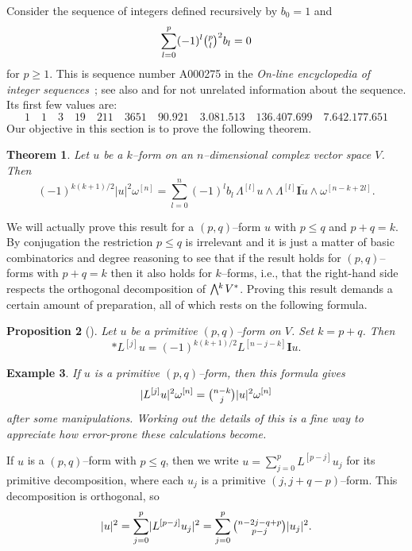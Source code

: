 \documentclass[11pt,a4paper]{amsart}
\def\^#1{^{[#1]}}
\def\bw#1{\bigwedge{}^{\mkern-5mu #1}\mkern2mu}
\def\I{\mathbf{I}}
\theoremstyle{slthm}
\newtheorem{theo}{Theorem}[section]
\newtheorem{prop}[theo]{Proposition}
\theoremstyle{sldef}
\newtheorem{exam}[theo]{Example}
\theoremstyle{slrem}
\numberwithin{equation}{section}
\begin{document}
Consider the sequence of integers defined recursively by $b_0 = 1$ and
\begin{equation}
\label{bezel}
\sum_{l=0}^{p} (-1)^{l} \tbinom{p}{l}^2 b_l = 0
\end{equation}
for $p \geq 1$. This is sequence number A000275 in the \textsl{On-line
encyclopedia of integer sequences}~\cite{OEIS}; see also \cite{Carlitz}
and \cite{Riordan} for not unrelated information about the sequence.
Its first few values are: 
$$
1 \quad 1 \quad 3 \quad 19 \quad 211 \quad 3651 \quad
90.921 \quad 3.081.513 \quad 136.407.699 \quad 7.642.177.651
$$
Our objective in this section is to prove the following theorem.


\begin{theo}
    \label{thm:norm}
Let $u$ be a $k$--form on an $n$--dimensional complex vector
space $V$. Then
$$
    (-1)^{k(k+1)/2}
    \lvert u \rvert^2 \omega\^n
    = \sum_{l=0}^n (-1)^{l} b_l \, 
    \Lambda\^l u \wedge \Lambda\^l \overline{\I u}
    \wedge \omega\^{n-k+2l}.
$$
\end{theo}

We will actually prove this result for a $(p,q)$--form $u$ with $p \leq q$
and $p+q = k$. By conjugation the restriction $p \leq q$ is irrelevant and
it is just a matter of basic combinatorics and degree reasoning to see
that if the result holds for $(p,q)$--forms with $p + q = k$ then it also
holds for $k$--forms, i.e., that the right-hand side respects the
orthogonal decomposition of $\bw{k}V^*$.  Proving this result demands a
certain amount of preparation, all of which rests on the following formula.


\begin{prop}[{{\cite[Proposition~1.67]{Huy}}}]
Let $u$ be a primitive $(p,q)$--form on $V$. Set $k = p+q$. Then
$$
    * L\^{j} u = (-1)^{k(k+1)/2} L\^{n-j-k} \I u.
$$
\end{prop}


\begin{exam}
If $u$ is a primitive $(p,q)$--form, then this formula gives
$$
\lvert L\^{j} u \rvert^2 \omega\^{n}
= \tbinom{n-k}{j} \lvert u \rvert^2 \omega\^{n}
$$
after some manipulations. Working out the details of this is a fine way to
appreciate how error-prone these calculations become.
\end{exam}


If $u$ is a $(p,q)$--form with $p \leq q$, then we write $u =
\sum_{j=0}^p L\^{p-j} u_j$ for its primitive decomposition, where each
$u_j$ is a primitive $(j,j+q-p)$--form. This decomposition is
orthogonal, so
$$
\lvert u \rvert^2
= \sum_{j=0}^p \lvert L\^{p-j} u_j \rvert^2
= \sum_{j=0}^p \tbinom{n-2j-q+p}{p-j} \lvert u_j \rvert^2.
$$
\end{document}
